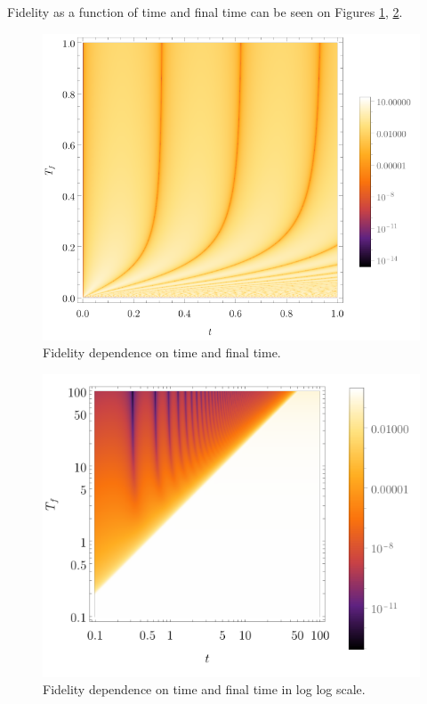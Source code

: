 Fidelity as a function of time and final time can be seen on Figures \ref{fig:dens1}, \ref{fig:dens3}.
\begin{figure}[H]
    \centering
    \includegraphics[scale=1.2]{../img/dens1.pdf}
    \caption{Fidelity dependence on time and final time.}
    \label{fig:dens1}
\end{figure}
\begin{figure}[H]
    \centering
    \includegraphics[scale=1.2]{../img/dens3.pdf}
    \caption{Fidelity dependence on time and final time in log log scale.}
    \label{fig:dens3}
\end{figure}

